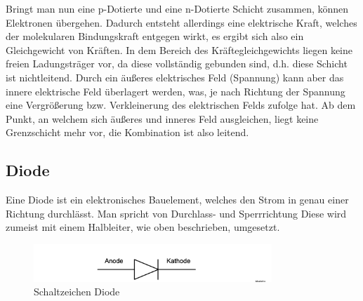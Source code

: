 \documentclass{article}
\theoremstyle{definition}
\begin{document}
    Bringt man nun eine p-Dotierte und eine n-Dotierte Schicht zusammen, können Elektronen übergehen. Dadurch entsteht allerdings eine elektrische Kraft, welches der molekularen Bindungskraft entgegen wirkt, 
    es ergibt sich also ein Gleichgewicht von Kräften. In dem Bereich des Kräftegleichgewichts liegen keine freien Ladungsträger vor, da diese vollständig gebunden sind, 
    d.h. diese Schicht ist nichtleitend. Durch ein äußeres elektrisches Feld (Spannung) kann aber das innere elektrische Feld überlagert werden, was, je nach Richtung der 
    Spannung eine Vergrößerung bzw. Verkleinerung des elektrischen Felds zufolge hat. Ab dem Punkt, an welchem sich äußeres und inneres Feld ausgleichen, liegt keine 
    Grenzschicht mehr vor, die Kombination ist also leitend.  
    \subsection{Diode}
    Eine Diode ist ein elektronisches Bauelement, welches den Strom in genau einer Richtung durchlässt. 
    Man spricht von Durchlass- und Sperrrichtung Diese wird zumeist mit einem Halbleiter, wie oben beschrieben, umgesetzt.
    \begin{figure}[H]
        \centering
        \includegraphics[width=0.8\textwidth]{figs/fig2_1.png}
        \caption{Schaltzeichen Diode\cite{anleitung}}
        \label{fig:Abb2.1}
    \end{figure}
\end{document}
